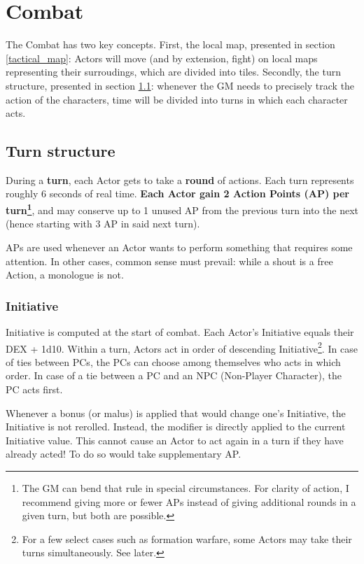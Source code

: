 \chapter{Combat}

The Combat has two key concepts. First, the local map, presented in section \ref{tactical_map}: Actors will move (and by extension, fight) on local maps representing their surroudings, which are divided into tiles. Secondly, the turn structure, presented in section \ref{turn_structure}: whenever the GM needs to precisely track the action of the characters, time will be divided into turns in which each character acts. 

\section{Turn structure}

\label{turn_structure}

During a \textbf{turn}, each Actor gets to take a \textbf{round} of actions. Each turn represents roughly 6 seconds of real time. \textbf{Each Actor gain 2 Action Points (AP) per turn\footnote{The GM can bend that rule in special circumstances. For clarity of action, I recommend giving more or fewer APs instead of giving additional rounds in a given turn, but both are possible.}}, and may conserve up to 1 unused AP from the previous turn into the next (hence starting with 3 AP in said next turn). 

APs are used whenever an Actor wants to perform something that requires some attention. In other cases, common sense must prevail: while a shout is a free Action, a monologue is not.

\subsection{Initiative}

Initiative is computed at the start of combat. Each Actor's Initiative equals their DEX + 1d10. Within a turn, Actors act in order of descending Initiative\footnote{For a few select cases such as formation warfare, some Actors may take their turns simultaneously. See later.}. In case of ties between PCs, the PCs can choose among themselves who acts in which order. In case of a tie between a PC and an NPC (Non-Player Character), the PC acts first.

Whenever a bonus (or malus) is applied that would change one's Initiative, the Initiative is not rerolled. Instead, the modifier is directly applied to the current Initiative value. This cannot cause an Actor to act again in a turn if they have already acted! To do so would take supplementary AP.


